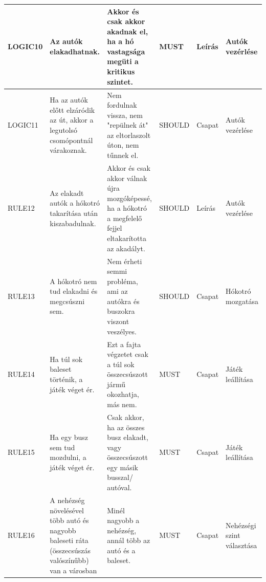 \begin{longtable}{| p{2cm} | p{4cm} | p{2.7cm} | p{2cm} | p{1.5cm} | p{2.0cm}|}
    LOGIC10 & %
    Az autók elakadhatnak.  & %
    Akkor és csak akkor akadnak el, ha a hó vastagsága megüti a kritikus szintet. & %
    MUST & %
    Leírás & %
    Autók vezérlése \\ %
    \hline

    LOGIC11 & %
    Ha az autók előtt elzáródik az út, akkor a legutolsó csomópontnál várakoznak.  & %
    Nem fordulnak vissza, nem "repülnek át" az eltorlaszolt úton, nem tűnnek el. & %
    SHOULD & %
    Csapat & %
    Autók vezérlése \\ %
    \hline

    RULE12 & %
    Az elakadt autók a hókotró takarítása után kiszabadulnak. & %
    Akkor és csak akkor válnak újra mozgóképessé, ha a hókotró a megfelelő fejjel eltakarította az akadályt.  & %
    SHOULD & %
    Leírás & %
    Autók vezérlése \\ %
    \hline

    RULE13 & %
    A hókotró nem tud elakadni és megcsúszni sem. & %
    Nem érheti semmi probléma, ami az autókra és buszokra viszont veszélyes. & %
    SHOULD & %
    Csapat & %
    Hókotró mozgatása \\ %
    \hline

    RULE14 & %
    Ha túl sok baleset történik, a játék véget ér.  & %
    Ezt a fajta végzetet csak a túl sok összecsúszott jármű okozhatja, más nem.  & %
    MUST & %
    Csapat & %
    Játék leállítása \\ %
    \hline

    RULE15 & %
    Ha egy busz sem tud mozdulni, a játék véget ér.  & %
    Csak akkor, ha az összes busz elakadt, vagy összecsúszott egy másik busszal/ autóval.  & %
    MUST & %
    Csapat & %
    Játék leállítása \\ %
    \hline

    RULE16 & %
    A nehézség növelésével több autó és nagyobb baleseti ráta (összecsúszás valószínűbb) van a városban  & %
    Minél nagyobb a nehézség, annál több az autó és a baleset.  & %
    MUST & %
    Csapat & %
    Nehézségi szint választása \\ %
    \hline
\end{longtable}

